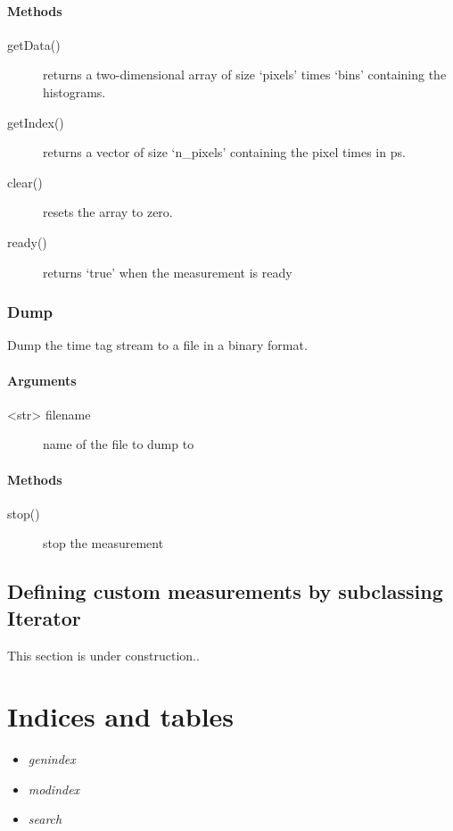 \documentclass[letterpaper,10pt,english]{sphinxmanual}
\begin{document}
\subsubsection{Methods}
\label{sections/api:id11}\begin{description}
\item[{getData()}] \leavevmode
returns a two-dimensional array of size `pixels' times `bins' containing the histograms.

\item[{getIndex()}] \leavevmode
returns a vector of size `n\_pixels' containing the pixel times in ps.

\item[{clear()}] \leavevmode
resets the array to zero.

\item[{ready()}] \leavevmode
returns `true' when the measurement is ready

\end{description}


\subsection{Dump}
\label{sections/api:dump}
Dump the time tag stream to a file in a binary format.


\subsubsection{Arguments}
\label{sections/api:id12}\begin{description}
\item[{\textless{}str\textgreater{} filename}] \leavevmode
name of the file to dump to

\end{description}


\subsubsection{Methods}
\label{sections/api:id13}\begin{description}
\item[{stop()}] \leavevmode
stop the measurement

\end{description}


\section{Defining custom measurements by subclassing Iterator}
\label{sections/api:defining-custom-measurements-by-subclassing-iterator}\label{sections/api:subclassing}
This section is under construction..


\chapter{Indices and tables}
\label{index:indices-and-tables}\begin{itemize}
\item {} 
\emph{genindex}

\item {} 
\emph{modindex}

\item {} 
\emph{search}

\end{itemize}



\renewcommand{\indexname}{Index}
\printindex
\end{document}
